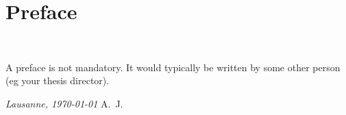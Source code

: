 \chapter*{Preface}
~\newline~\newline~
A preface is not mandatory. It would typically be written by some other person (eg your thesis director).


\bigskip
 
\noindent\textit{Lausanne, \today}
\hfill A.~J.
